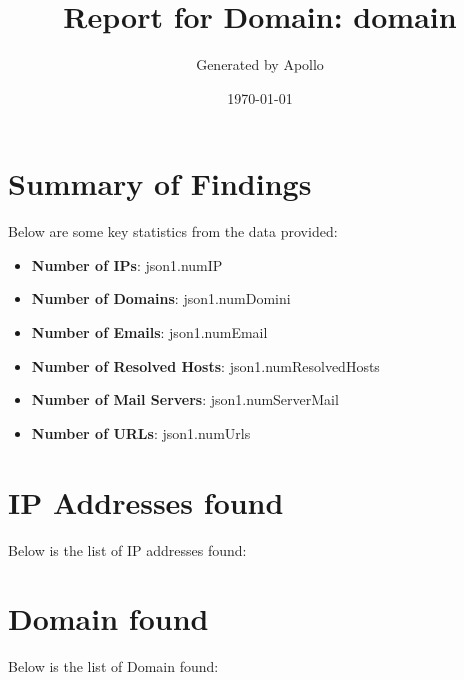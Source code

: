 \documentclass{article}
\title{Report for Domain: {{ domain }}}
\author{Generated by Apollo}
\date{\today}
\begin{document}
\maketitle
\clearpage

\tableofcontents  %

\clearpage

\section{Summary of Findings}

Below are some key statistics from the data provided:

\begin{itemize}
    \item \textbf{Number of IPs}: {{ json1.numIP }}
    \item \textbf{Number of Domains}: {{ json1.numDomini }}
    \item \textbf{Number of Emails}: {{ json1.numEmail }}
    \item \textbf{Number of Resolved Hosts}: {{ json1.numResolvedHosts }}
    \item \textbf{Number of Mail Servers}: {{ json1.numServerMail }}
    \item \textbf{Number of URLs}: {{ json1.numUrls }}
\end{itemize}

\clearpage

\section{IP Addresses found}

Below is the list of IP addresses found:



\clearpage

\section{Domain found}

Below is the list of Domain found:

\end{document}
